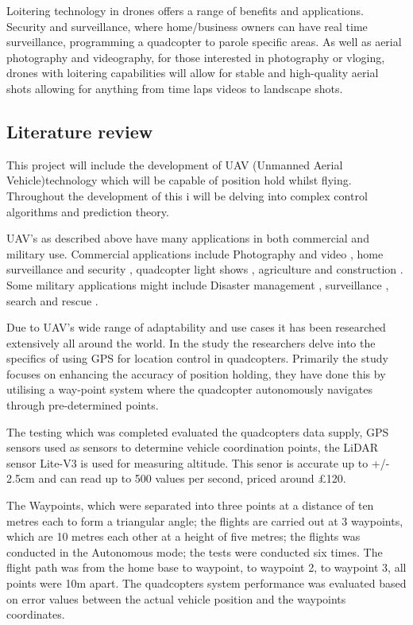 \documentclass{article}
\begin{document}
Loitering technology in drones offers a range of benefits and applications. Security and surveillance, where home/business 
owners can have real time surveillance, programming a quadcopter to parole specific areas. As well as aerial photography and 
videography, for those interested in photography or vloging, drones with loitering capabilities will allow for stable and
high-quality aerial shots allowing for anything from time laps videos to landscape shots.

\subsection{Literature review}
This project will include the development of UAV (Unmanned Aerial Vehicle)technology which will be capable of position hold whilst flying. Throughout the development of this i will be delving into complex control algorithms and prediction theory. 

UAV's as described above have many applications in both commercial and military use. Commercial applications include Photography 
and video \cite{photographyAndVideo}, home surveillance and security \cite{security}, quadcopter light shows \cite{lightShow}, agriculture \cite{agricultural} and construction \cite{construction}. Some military applications might include Disaster management \cite{disasterManagement}, surveillance \cite{surveillance}, search and rescue \cite{searchAndRescue}.

Due to UAV's wide range of adaptability and use cases it has been researched extensively all around the world. In the study \cite{Widhianto2023Quadcopter} the researchers delve into the specifics of using GPS for location control in quadcopters. Primarily the study focuses on enhancing the accuracy of position holding, they have done this by utilising a way-point system where the quadcopter autonomously navigates through pre-determined points.

The testing which was completed evaluated the quadcopters data supply, GPS sensors used as sensors to determine vehicle coordination points, the LiDAR sensor Lite-V3 is used for measuring altitude. This senor is accurate up to +/- 2.5cm and can read up to 500 values per second, priced around £120.

The Waypoints, which were separated into three points at a distance of ten metres each to form a triangular angle; the flights are carried out at 3 waypoints, which are 10 metres each other at a height of five metres; the flights was conducted in the Autonomous mode; the tests were conducted six times. The flight path was from the home base to waypoint, to waypoint 2, to waypoint 3, all points were 10m apart. The quadcopters system performance was evaluated based on error values between the actual vehicle position and the waypoints coordinates.
\end{document}

